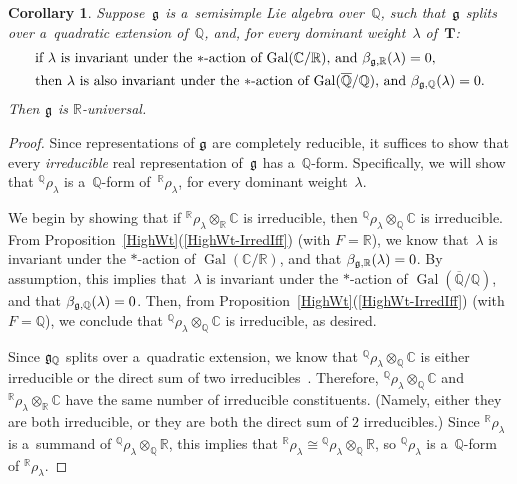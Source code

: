 \documentclass[11pt]{article}
\DeclareMathOperator{\Gal}{Gal}
\numberwithin{equation}{section}
\newtheorem{cor}[prop]{Corollary}
\newcommand{\Lie}[1]{\mathfrak{\lowercase{#1}}}
\begin{document}
\begin{cor}
Suppose~$\Lie G$ is a~semisimple Lie algebra over~$\mathbb{Q}$, such that~$\Lie G$ splits over a~quadratic
extension of~$\mathbb{Q}$, and, for every dominant weight~$\lambda$ of~$\mathbf{T}$:
\begin{gather}
\begin{split}
& \text{if~$\lambda$ is invariant under the $*$-action of~$\Gal(\mathbb{C}/\mathbb{R})$, and $\beta_{\Lie G,\mathbb{R}}(\lambda) = 0$,}
\\
& \text{then~$\lambda$ is also invariant under the $*$-action of $\Gal(\overline{\mathbb{Q}}/\mathbb{Q})$, and
$\beta_{\Lie G,\mathbb{Q}}(\lambda) = 0$.}
\end{split}\label{SplitOverQuadIff-weight}
\end{gather}
Then $\Lie G$ is $\mathbb{R}$-universal.
\end{cor}

\begin{proof}
Since representations of $\Lie G$ are completely reducible, it suf\/f\/ices to show that every \emph{irreducible} real
representation of~$\Lie G$ has a~$\mathbb{Q}$-form.
Specif\/ically, we will show that ${}^\mathbb{Q} \rho_\lambda$ is a~$\mathbb{Q}$-form of~${}^\mathbb{R} \rho_\lambda$, for
every dominant weight~$\lambda$.

We begin by showing that if ${}^\mathbb{R} \rho_\lambda \otimes_\mathbb{R} \mathbb{C}$ is irreducible, then
${}^\mathbb{Q} \rho_\lambda \otimes_\mathbb{Q} \mathbb{C}$ is irreducible.
From Proposition~\ref{HighWt}(\ref{HighWt-IrredIff}) (with $F = \mathbb{R}$), we know that~$\lambda$ is invariant under the $*$-action
of $\Gal(\mathbb{C}/\mathbb{R})$, and that $\beta_{\Lie G,\mathbb{R}}(\lambda) = 0$.
By assumption, this implies that~$\lambda$ is invariant under the $*$-action of\/
$\Gal(\overline{\mathbb{Q}}/\mathbb{Q})$, and that $\beta_{\Lie G,\mathbb{Q}}(\lambda) = 0$.
Then, from Proposition~\ref{HighWt}(\ref{HighWt-IrredIff}) (with $F = \mathbb{Q}$), we conclude that ${}^\mathbb{Q} \rho_\lambda
\otimes_\mathbb{Q} \mathbb{C}$ is irreducible, as desired.

Since $\Lie G_\mathbb{Q}$ splits over a~quadratic extension, we know that ${}^\mathbb{Q} \rho_\lambda \otimes_\mathbb{Q}
\mathbb{C}$ is either irreducible or the direct sum of two irreducibles~\cite[Corollary~3.2(2)]{Morris-RRepsQForms}.
Therefore, ${}^\mathbb{Q} \rho_\lambda \otimes_\mathbb{Q} \mathbb{C}$ and ${}^\mathbb{R} \rho_\lambda \otimes_\mathbb{R}
\mathbb{C}$ have the same number of irreducible constituents.
(Namely, either they are both irreducible, or they are both the direct sum of $2$ irreducibles.) Since ${}^\mathbb{R}
\rho_\lambda$ is a~summand of ${}^\mathbb{Q} \rho_\lambda \otimes_\mathbb{Q} \mathbb{R}$, this implies that
${}^\mathbb{R} \rho_\lambda \cong {}^\mathbb{Q} \rho_\lambda \otimes_\mathbb{Q} \mathbb{R}$, so ${}^\mathbb{Q}
\rho_\lambda$ is a~$\mathbb{Q}$-form of ${}^\mathbb{R} \rho_\lambda$.
\end{proof}
\end{document}
